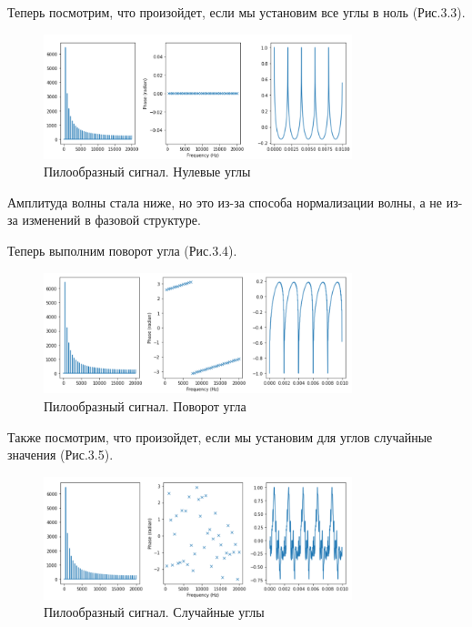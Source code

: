 \documentclass[a4paper,12pt]{report}
\begin{document}
    Теперь посмотрим, что произойдет, если мы установим все углы в ноль (Рис.3.3).
\begin{figure}[H]
        \centering
        \includegraphics[width=0.8\textwidth]{fig3-3.PNG}
        \caption{Пилообразный сигнал. Нулевые углы}
        \label{fig:fig3-3}
\end{figure} 
    
    Амплитуда волны стала ниже, но это из-за способа нормализации волны, а не из-за изменений в фазовой структуре.  
    
    Теперь выполним поворот угла (Рис.3.4).
\begin{figure}[H]
        \centering
        \includegraphics[width=0.8\textwidth]{fig3-4.PNG}
        \caption{Пилообразный сигнал. Поворот угла}
        \label{fig:fig3-4}
\end{figure}

    Также посмотрим, что произойдет, если мы установим для углов случайные значения (Рис.3.5).
\begin{figure}[H]
        \centering
        \includegraphics[width=0.8\textwidth]{fig3-5.PNG}
        \caption{Пилообразный сигнал. Случайные углы}
        \label{fig:fig3-5}
\end{figure}  
\end{document}
